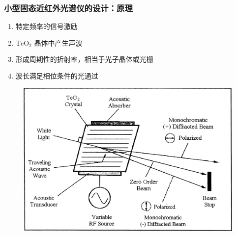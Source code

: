 \begin{frame}[c]
    \frametitle{小型固态近红外光谱仪的设计：原理}
    \begin{enumerate}
        \item 特定频率的信号激励
        \item $\mathrm{TeO}_2$ 晶体中产生声波
        \item 形成周期性的折射率，相当于光子晶体或光栅
        \item 波长满足相位条件的光通过
    \end{enumerate}
    \begin{figure}[H] %
        \centering %
        \includegraphics[width=.8\textwidth]{figures/Design of a miniature solid state NIR spectrometer_3.png} %
    \end{figure}
\end{frame}

